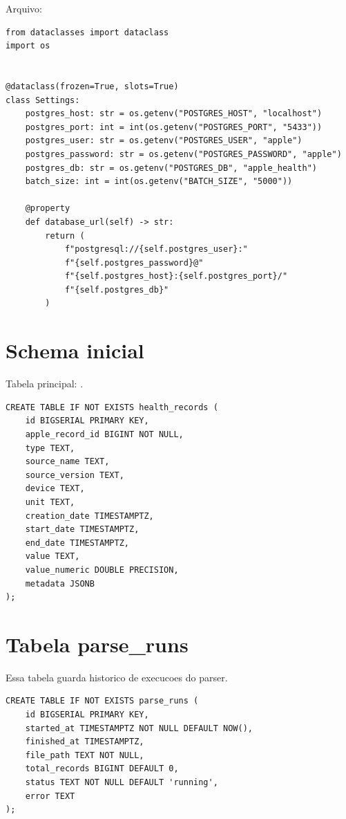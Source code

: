 Arquivo: 

\begin{lstlisting}[style=devbutterpython]
from dataclasses import dataclass
import os


@dataclass(frozen=True, slots=True)
class Settings:
    postgres_host: str = os.getenv("POSTGRES_HOST", "localhost")
    postgres_port: int = int(os.getenv("POSTGRES_PORT", "5433"))
    postgres_user: str = os.getenv("POSTGRES_USER", "apple")
    postgres_password: str = os.getenv("POSTGRES_PASSWORD", "apple")
    postgres_db: str = os.getenv("POSTGRES_DB", "apple_health")
    batch_size: int = int(os.getenv("BATCH_SIZE", "5000"))

    @property
    def database_url(self) -> str:
        return (
            f"postgresql://{self.postgres_user}:"
            f"{self.postgres_password}@"
            f"{self.postgres_host}:{self.postgres_port}/"
            f"{self.postgres_db}"
        )
\end{lstlisting}

\section{Schema inicial}

Tabela principal: .

\begin{lstlisting}[style=devbuttersql]
CREATE TABLE IF NOT EXISTS health_records (
    id BIGSERIAL PRIMARY KEY,
    apple_record_id BIGINT NOT NULL,
    type TEXT,
    source_name TEXT,
    source_version TEXT,
    device TEXT,
    unit TEXT,
    creation_date TIMESTAMPTZ,
    start_date TIMESTAMPTZ,
    end_date TIMESTAMPTZ,
    value TEXT,
    value_numeric DOUBLE PRECISION,
    metadata JSONB
);
\end{lstlisting}

\section{Tabela parse\_runs}

Essa tabela guarda historico de execucoes do parser.

\begin{lstlisting}[style=devbuttersql]
CREATE TABLE IF NOT EXISTS parse_runs (
    id BIGSERIAL PRIMARY KEY,
    started_at TIMESTAMPTZ NOT NULL DEFAULT NOW(),
    finished_at TIMESTAMPTZ,
    file_path TEXT NOT NULL,
    total_records BIGINT DEFAULT 0,
    status TEXT NOT NULL DEFAULT 'running',
    error TEXT
);
\end{lstlisting}

